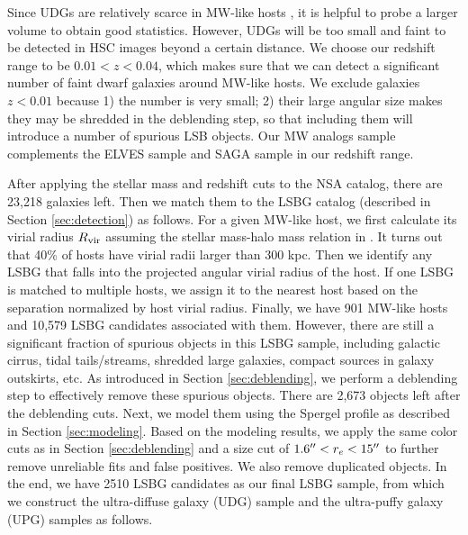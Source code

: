 \documentclass[twocolumn,astrosymb,twocolappendix]{aastex631}
\begin{document}
\begin{CJK*}{UTF8}{gbsn}
Since UDGs are relatively scarce in MW-like hosts \citep{SAGA-II,CarlstenELVES2022}, it is helpful to probe a larger volume to obtain good statistics. However, UDGs will be too small and faint to be detected in HSC images beyond a certain distance. We choose our redshift range to be $0.01 < z < 0.04$, which makes sure that we can detect a significant number of faint dwarf galaxies around MW-like hosts. We exclude galaxies $z<0.01$ because 1) the number is very small; 2) their large angular size makes they may be shredded in the deblending step, so that including them will introduce a number of spurious LSB objects. Our MW analogs sample complements the ELVES sample and SAGA sample in our redshift range. 

After applying the stellar mass and redshift cuts to the NSA catalog, there are 23,218 galaxies left. Then we match them to the LSBG catalog (described in Section \ref{sec:detection}) as follows. For a given MW-like host, we first calculate its virial radius $R_{\rm vir}$ assuming the stellar mass-halo mass relation in \citet{Behroozi2010}. It turns out that 40\% of hosts have virial radii larger than 300 kpc. Then we identify any LSBG that falls into the projected angular virial radius of the host. If one LSBG is matched to multiple hosts, we assign it to the nearest host based on the separation normalized by host virial radius. Finally, we have 901 MW-like hosts and 10,579 LSBG candidates associated with them. However, there are still a significant fraction of spurious objects in this LSBG sample, including galactic cirrus, tidal tails/streams, shredded large galaxies, compact sources in galaxy outskirts, etc. As introduced in Section \ref{sec:deblending}, we perform a deblending step to effectively remove these spurious objects. There are 2,673 objects left after the deblending cuts. Next, we model them using the Spergel profile as described in Section \ref{sec:modeling}. Based on the modeling results, we apply the same color cuts as in Section \ref{sec:deblending} and a size cut of $1.6\mbox{$^{\prime\prime}$} < r_e < 15\mbox{$^{\prime\prime}$}$ to further remove unreliable fits and false positives. We also remove duplicated objects. In the end, we have 2510 LSBG candidates as our final LSBG sample, from which we construct the ultra-diffuse galaxy (UDG) sample and the ultra-puffy galaxy (UPG) samples as follows. 


\end{CJK*}
\end{document}
